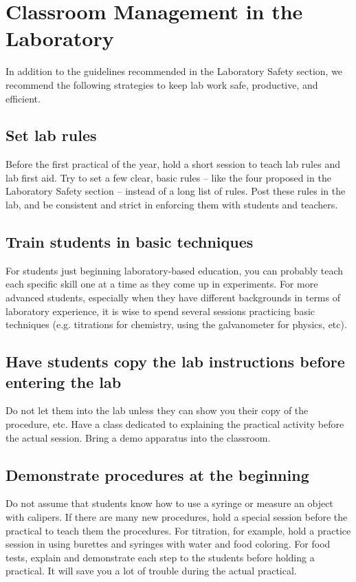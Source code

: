 \chapter{Classroom Management in the Laboratory}
\label{cha:classmanagement}

In addition to the guidelines recommended 
in the Laboratory Safety section, 
we recommend the following strategies to keep lab work safe, 
productive, 
and efficient.

\section{Set lab rules}
Before the first practical of the year, 
hold a short session to teach lab rules and lab first aid. 
Try to set a few clear, 
basic rules – 
like the four proposed in the Laboratory Safety section – 
instead of a long list of rules. 
Post these rules in the lab, 
and be consistent and strict 
in enforcing them with students and teachers.

\section{Train students in basic techniques}
For students just beginning laboratory-based education, 
you can probably teach each specific skill 
one at a time as they come up in experiments. 
For more advanced students, 
especially when they have different backgrounds 
in terms of laboratory experience, 
it is wise to spend several sessions practicing basic techniques (e.g. 
titrations for chemistry, 
using the galvanometer for physics, 
etc).

\section{Have students copy the lab instructions before entering the lab}
Do not let them into the lab unless 
they can show you their copy of the procedure, 
etc. 
Have a class dedicated to explaining 
the practical activity before the actual session. 
Bring a demo apparatus into the classroom.

\section{Demonstrate procedures at the beginning}
Do not assume that students know how to use a syringe 
or measure an object with calipers. 
If there are many new procedures, 
hold a special session before the practical to teach them the procedures. 
For titration, for example, 
hold a practice session in using burettes 
and syringes with water and food coloring. 
For food tests, 
explain and demonstrate each step to the students 
before holding a practical. 
It will save you a lot of trouble during the actual practical.

